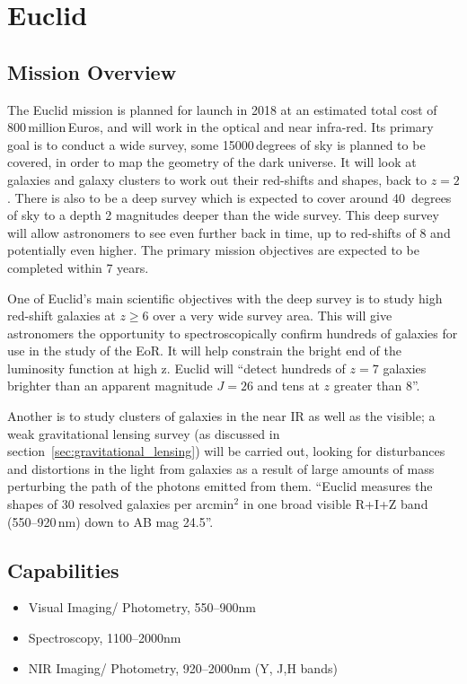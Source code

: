 
\section{Euclid} %
\label{sec:euclid}

	\subsection{Mission Overview} %
	\label{sub:mission_overview}
		The Euclid mission is planned for launch in 2018\cite[p.~8]{Euclid_Definition_Study_Report} at an estimated total cost of 800\,million\,Euros, and will work in the optical and near infra-red\cite{bbc_euclid}. Its primary goal is to conduct a wide survey, some 15000\,degrees of sky is planned to be covered, in order to map the geometry of the dark universe. It will look at galaxies and galaxy clusters to work out their red-shifts and shapes, back to $z=2$. There is also to be a deep survey which is expected to cover around 40\, degrees of sky to a depth 2 magnitudes deeper than the wide survey. This deep survey will allow astronomers to see even further back in time, up to red-shifts of 8 and potentially even higher. The primary mission objectives are expected to be completed within 7 years.

		One of Euclid’s main scientific objectives with the deep survey is to study high red-shift galaxies at $z\ge6$ over a very wide survey area. This will give astronomers the opportunity to spectroscopically confirm hundreds of galaxies for use in the study of the EoR. It will help constrain the bright end of the luminosity function at high z. Euclid will ``detect hundreds of $z=7$ galaxies brighter than an apparent magnitude $J=26$ and tens at $z$ greater than 8''\cite{Euclid_Definition_Study_Report}.

		Another is to study clusters of galaxies in the near IR as well as the visible; a weak gravitational lensing survey (as discussed in section~\ref{sec:gravitational_lensing}) will be carried out, looking for disturbances and distortions in the light from galaxies as a result of large amounts of mass perturbing the path of the photons emitted from them. ``Euclid measures the shapes of 30 resolved galaxies per arcmin$^2$ in one broad visible R+I+Z band (550--920\,\si{\nano\metre}) down to AB mag 24.5''\cite[p.~9]{Euclid_Definition_Study_Report}.

	\subsection{Capabilities} %
	\label{sub:capabilities}
		\begin{itemize}
			\item Visual Imaging/ Photometry, 550--900\si{\nano\metre}
			\item Spectroscopy, 1100--2000\si{\nano\metre}
			\item NIR Imaging/ Photometry, 920--2000\si{\nano\metre} (Y, J,H bands)
		\end{itemize}

